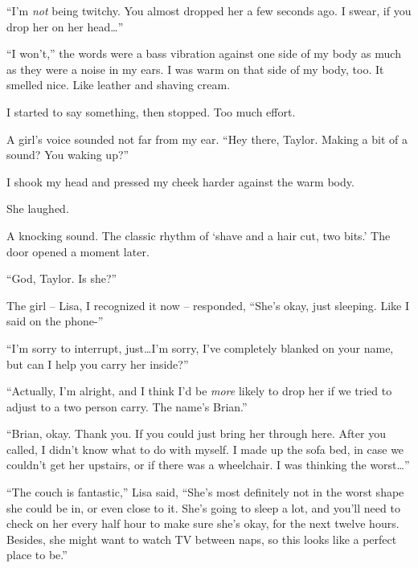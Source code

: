 ``I'm \emph{not} being twitchy.  You almost dropped her a few seconds ago.  I swear, if you drop her on her head\ldots''



``I won't,'' the words were a bass vibration against one side of my body as much as they were a noise in my ears.  I was warm on that side of my body, too.  It smelled nice.  Like leather and shaving cream.



I started to say something, then stopped.  Too much effort.



A girl's voice sounded not far from my ear.  ``Hey there, Taylor.  Making a bit of a sound?  You waking up?''



I shook my head and pressed my cheek harder against the warm body.



She laughed.



A knocking sound.  The classic rhythm of `shave and a hair cut, two bits.'  The door opened a moment later.



``God, Taylor.  Is she?''



The girl – Lisa, I recognized it now – responded, ``She's okay, just sleeping.  Like I said on the phone-''



``I'm sorry to interrupt, just\ldots I'm sorry, I've completely blanked on your name, but can I help you carry her inside?''



``Actually, I'm alright, and I think I'd be \emph{more} likely to drop her if we tried to adjust to a two person carry.  The name's Brian.''



``Brian, okay.  Thank you.  If you could just bring her through here.  After you called, I didn't know what to do with myself.  I made up the sofa bed, in case we couldn't get her upstairs, or if there was a wheelchair.  I was thinking the worst\ldots''



``The couch is fantastic,'' Lisa said, ``She's most definitely not in the worst shape she could be in, or even close to it.  She's going to sleep a lot, and you'll need to check on her every half hour to make sure she's okay, for the next twelve hours.  Besides, she might want to watch TV between naps, so this looks like a perfect place to be.''



